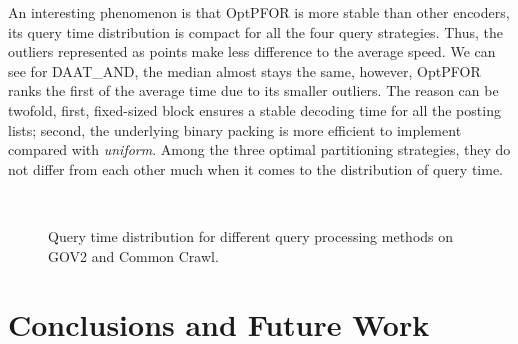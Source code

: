 \documentclass[runningheads,a4paper]{llncs}
\begin{document}
An interesting phenomenon is that OptPFOR is more stable than other encoders, its query time distribution is compact for all the four query strategies.
Thus, the outliers represented as points make less difference to the average speed.
We can see for DAAT\_AND, the median almost stays the same, however, OptPFOR ranks the first of the average time due to its smaller outliers.
The reason can be twofold, first, fixed-sized block ensures a stable decoding time for all the posting lists; second, the underlying binary packing is more efficient to implement compared with \textit{uniform}.
Among the three optimal partitioning strategies, they do not differ from each other much when it comes to the distribution of query time.
\begin{figure}
	\centering
	\\
	
	\caption{Query time distribution for different query processing methods on GOV2 and Common Crawl.}
	\label{fig:queries}
\end{figure}

\section{Conclusions and Future Work}\label{sec:conclusion}
\end{document}
